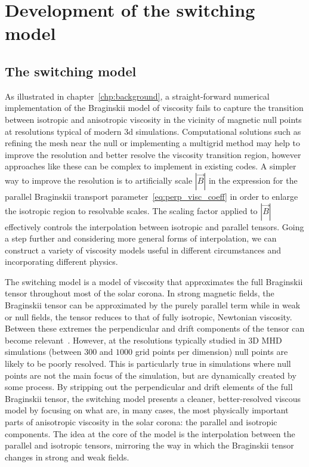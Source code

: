 \chapter{Development of the switching model}
\label{chp:switching_model}

\graphicspath{{images/development_of_switching_model/}}



\section{The switching model}

As illustrated in chapter~\ref{chp:background}, a straight-forward numerical implementation of the Braginskii model of viscosity fails to capture the transition between isotropic and anisotropic viscosity in the vicinity of magnetic null points at resolutions typical of modern 3d simulations. Computational solutions such as refining the mesh near the null or implementing a multigrid method may help to improve the resolution and better resolve the viscosity transition region, however approaches like these can be complex to implement in existing codes. A simpler way to improve the resolution is to artificially scale $|\vec{B}|$ in the expression for the parallel Braginskii transport parameter~\ref{eq:perp_visc_coeff} in order to enlarge the isotropic region to resolvable scales. The scaling factor applied to $|\vec{B}|$ effectively controls the interpolation between isotropic and parallel tensors. Going a step further and considering more general forms of interpolation, we can construct a variety of viscosity models useful in different circumstances and incorporating different physics.

The switching model is a model of viscosity that approximates the full Braginskii tensor throughout most of the solar corona. In strong magnetic fields, the Braginskii tensor can be approximated by the purely parallel term while in weak or null fields, the tensor reduces to that of fully isotropic, Newtonian viscosity. Between these extremes the perpendicular and drift components of the tensor can become relevant~\cite{erdelyiResonantAbsorptionAlfven1995a}. However, at the resolutions typically studied in 3D MHD simulations (between $300$ and $1000$ grid points per dimension) null points are likely to be poorly resolved. This is particularly true in simulations where null points are not the main focus of the simulation, but are dynamically created by some process. By stripping out the perpendicular and drift elements of the full Braginskii tensor, the switching model presents a cleaner, better-resolved viscous model by focusing on what are, in many cases, the most physically important parts of anisotropic viscosity in the solar corona: the parallel and isotropic components. The idea at the core of the model is the interpolation between the parallel and isotropic tensors, mirroring the way in which the Braginskii tensor changes in strong and weak fields.

